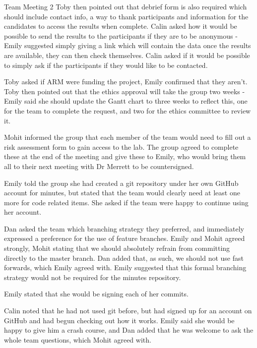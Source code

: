 \documentclass{article}
\begin{document}
\begin{Minutes}{Team Meeting 2}
Toby then pointed out that debrief form is also required which should include contact info, a way to thank
participants and information for the candidates to access the results when complete. Calin asked how it
would be possible to send the results to the participants if they are to be anonymous - Emily suggested
simply giving a link which will contain the data once the results are available, they can then check
themselves. Calin asked if it would be possible to simply ask if the participants if they would like to be
contacted.

Toby asked if ARM were funding the project, Emily confirmed that they aren't. Toby then pointed out that
the ethics approval will take the group two weeks - Emily said she should update the Gantt chart to three
weeks to reflect this, one for the team to complete the request, and two for the ethics committee to review
it.



Mohit informed the group that each member of the team would need to fill out a risk assessment form to gain
access to the lab. The group agreed to complete these at the end of the meeting and give these to Emily, who
would bring them all to their next meeting with Dr Merrett to be countersigned.



Emily told the group she had created a git repository under her own GitHub account for minutes, but stated
that the team would clearly need at least one more for code related items. She asked if the team were happy
to continue using her account.

Dan asked the team which branching strategy they preferred, and immediately expressed a preference for the
use of feature branches. Emily and Mohit agreed strongly, Mohit stating that we should absolutely refrain
from committing directly to the master branch. Dan added that, as such, we should not use fast forwards,
which Emily agreed with. Emily suggested that this formal branching strategy would not be required for the
minutes repository.

Emily stated that she would be signing each of her commits.

Calin noted that he had not used git before, but had signed up for an account on GitHub and had begun
checking out how it works. Emily said she would be happy to give him a crash course, and Dan added that
he was welcome to ask the whole team questions, which Mohit agreed with.


\end{Minutes}
\end{document}
